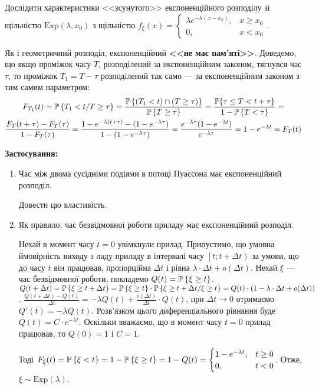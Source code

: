 \begin{exercise}
    Дослідити характеристики <<зсунутого>> експоненційного розподілу
    зі щільністю
    $\mathrm{Exp}(\lambda, x_0)$ з щільністю $f_\xi(x) = \begin{cases}
        \lambda e^{-\lambda (x-x_0)}, & x \geq x_0 \\
        0, & x < x_0
    \end{cases}$.
\end{exercise}

Як і геометричний розподіл, експоненційний \textbf{<<не має пам'яті>>}.
Доведемо, що якщо проміжок часу $T$, розподілений за експоненційним законом,
тягнувся час $\tau$, то проміжок $T_1 = T - \tau$ розподілений так само --- 
за експоненційним законом з тим самим параметром:
\begin{gather*}
    F_{T_1}(t) = \P\left\{T_1 < t / T \geq \tau\right\} = 
    \frac{\P\left\{(T_1 < t) \cap (T \geq \tau)\right\}}{\P\left\{ T \geq \tau \right\}} =
    \frac{\P{\left\{\tau \leq T < t +\tau\right\}}}{1 - \P\left\{ T < \tau \right\}} = \\
    \frac{F_T(t+\tau) - F_T(\tau)}{1-F_T(\tau)} = 
    \frac{1-e^{-\lambda (t+\tau)} - (1 - e^{-\lambda \tau})}{1-(1-e^{-\lambda \tau})} =
    \frac{e^{-\lambda \tau}(1-e^{-\lambda t})}{e^{-\lambda \tau}} = 1-e^{-\lambda t} = F_T(t)
\end{gather*}

\noindent\textbf{Застосування:}
\begin{enumerate}
    \item Час між двома сусідніми подіями в потоці Пуассона має експоненційний розподіл.
    \begin{exercise}
        Довести цю властивість.
    \end{exercise}
    \item Як правило, час безвідмовної роботи приладу має експоненційний розподіл.
    
    Нехай в момент часу $t=0$ увімкнули прилад. Припустимо, що умовна ймовірність виходу з ладу
    приладу в інтервалі часу $\left[ t; t+\Delta t\right)$ за умови, що до часу $t$ він працював,
    пропорційна $\Delta t$ і рівна $\lambda\cdot \Delta t + o(\Delta t)$. Нехай $\xi$ --- час безвідмовної роботи,
    покладемо $Q(t) = \P\left\{\xi \geq t\right\}$.
    $Q(t+\Delta t) = \P\left\{\xi \geq t + \Delta t\right\} = \P\left\{\xi \geq t\right\} \cdot \P\left\{\xi \geq t+\Delta t / \xi \geq t\right\} = 
    Q(t) \cdot (1 - \lambda\cdot \Delta t + o(\Delta t))$.
    $\frac{Q(t+\Delta t) - Q(t)}{\Delta t} = -\lambda Q(t) + \frac{o(\Delta t)}{\Delta t} \cdot Q(t)$,
    при $\Delta t \rightarrow 0$ отримаємо $Q'(t) = -\lambda Q(t)$.
    Розв'язком цього диференціального рівняння буде $Q(t) = C\cdot e^{-\lambda t}$.
    Оскільки вважаємо, що в момент часу $t=0$ прилад працював, то $Q(0) = 1$ і $C=1$.

    Тоді $F_\xi(t) = \P\left\{ \xi < t\right\} = 1 - \P\left\{ \xi \geq t\right\} = 1 - Q(t) = \begin{cases}
        1 - e^{-\lambda t}, & t \geq 0 \\
        0, & t < 0
    \end{cases}$. Отже, $\xi \sim \mathrm{Exp}(\lambda)$.
\end{enumerate}

